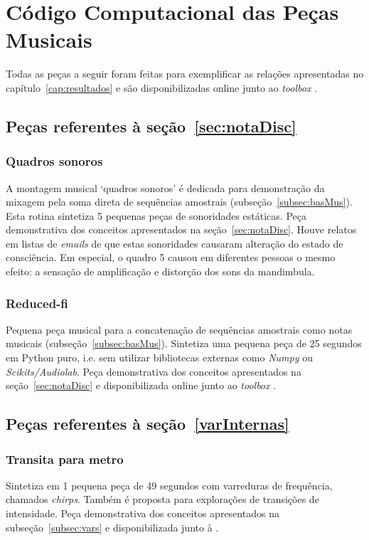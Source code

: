 \chapter{Código Computacional das Peças Musicais}
\label{cap:codigoPecas}
Todas as peças a seguir foram feitas para exemplificar as relações apresentadas no capítulo~\ref{cap:resultados} e são disponibilizadas online junto ao \emph{toolbox} \massa.\cite{MASSA}

\clearpage
\section{Peças referentes à seção~\ref{sec:notaDisc}}

\subsection{Quadros sonoros}\label{ap:quadros}
A montagem musical `quadros sonoros' é dedicada para demonstração da mixagem pela soma direta de sequências amostrais (subseção~\ref{subsec:basMus}). Esta rotina sintetiza 5 pequenas peças de sonoridades estáticas. Peça demonstrativa dos conceitos apresentados na seção~\ref{sec:notaDisc}. Houve relatos em listas de \emph{emails} de que estas sonoridades causaram alteração do estado de consciência. Em especial, o quadro 5 causou em diferentes pessoas o mesmo efeito: a sensação de amplificação e distorção dos sons da mandimbula. 

\clearpage


\subsection{Reduced-fi}\label{ap:reduced}
Pequena peça musical para a concatenação de sequências amostrais como notas musicais (subseção~\ref{subsec:basMus}). Sintetiza uma pequena peça de 25 segundos em Python puro, i.e. sem utilizar bibliotecas externas como \emph{Numpy} ou \emph{Scikits/Audiolab}. Peça demonstrativa dos conceitos apresentados na seção~\ref{sec:notaDisc} e disponibilizada online junto ao \emph{toolbox} \massa.\cite{MASSA}


\clearpage
\section{Peças referentes à seção~\ref{varInternas}}

\subsection{Transita para metro}\label{ap:transita}
Sintetiza em 1 pequena peça de 49 segundos com varreduras de frequência, chamados \emph{chirps}. Também é proposta para explorações de transições de intensidade. Peça demonstrativa dos conceitos apresentados na subseção~\ref{subsec:vars} e disponibilizada junto à \massa.\cite{MASSA}

